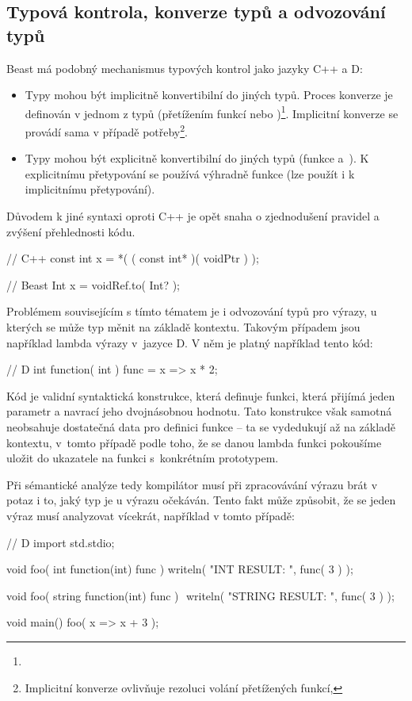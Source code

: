 \subsection{Typová kontrola, konverze typů a odvozování typů}
Beast má podobný mechanismus typových kontrol jako jazyky C++ a D:
\begin{itemize}
	\item Typy mohou být implicitně konvertibilní do jiných typů. Proces konverze je definován v jednom z typů (přetížením funkcí  nebo )\footnote{}. Implicitní konverze se provádí sama v případě potřeby\footnote{Implicitní konverze ovlivňuje rezoluci volání přetížených funkcí, }.
	\item Typy mohou být explicitně konvertibilní do jiných typů (funkce  a~). K explicitnímu přetypování se používá výhradně funkce  (lze použít i k implicitnímu přetypování).
\end{itemize}

Důvodem k jiné syntaxi oproti C++ je opět snaha o zjednodušení pravidel a zvýšení přehlednosti kódu.

\begin{cppcode}
// C++
const int x = *( ( const int* )( voidPtr ) );
\end{cppcode}

\begin{code}
// Beast
Int x = voidRef.to( Int? );
\end{code}

Problémem souvisejícím s tímto tématem je i odvozování typů pro výrazy, u kterých se může typ měnit na základě kontextu. Takovým případem jsou například lambda výrazy v~jazyce D. V něm je platný například tento kód:

\begin{dcode}
// D
int function( int ) func = x => x * 2;
\end{dcode}

Kód  je validní syntaktická konstrukce, která definuje funkci, která přijímá jeden parametr a navrací jeho dvojnásobnou hodnotu. Tato konstrukce však samotná neobsahuje dostatečná data pro definici funkce -- ta se vydedukují až na základě kontextu, v~tomto případě podle toho, že se danou lambda funkci pokoušíme uložit do ukazatele na funkci s~konkrétním prototypem.

Při sémantické analýze tedy kompilátor musí při zpracovávání výrazu brát v potaz i to, jaký typ je u výrazu očekáván. Tento fakt může způsobit, že se jeden výraz musí analyzovat vícekrát, například v tomto případě:
\begin{dcode}
// D
import std.stdio;

void foo( int function(int) func ) {
	writeln( "INT RESULT: ", func( 3 ) );
}

void foo( string function(int) func ) { $\label{typeInfer:1}$
	writeln( "STRING RESULT: ", func( 3 ) );
}

void main() {
	foo( x => x + 3 );
}
\end{dcode}


